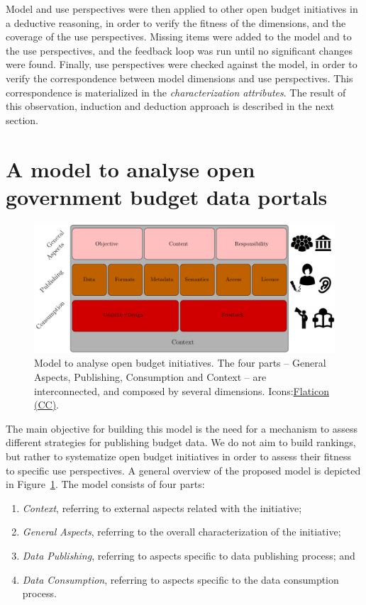 Model and use perspectives were then applied to other open budget initiatives in a deductive reasoning, in order to verify the fitness of the dimensions, and the coverage of the use perspectives.
Missing items were added to the model and to the use perspectives, and the feedback loop was run until no significant changes were found.
Finally, use perspectives were checked against the model, in order to verify the correspondence between model dimensions and use perspectives.
This correspondence is materialized in the \emph{characterization attributes}. The result of this observation, induction and deduction approach is described in the next section.

\section{A model to analyse open government budget data portals}
\label{sec:framework} 

\begin{figure}[ht]
\begin{center}
\includegraphics[scale=0.75]{images/model.pdf}
\caption{Model to analyse open budget initiatives. The four parts -- General Aspects, Publishing, Consumption and Context -- are interconnected, and composed by several dimensions. Icons:\href{http://www.flaticon.com/authors/icomoon}{Flaticon (CC)}.}
\label{fig:framework}
\end{center}
\end{figure}

The main objective for building this model is the need for a mechanism to assess different strategies for publishing budget data. 
We do not aim to build rankings, but rather to systematize open budget initiatives in order to assess their fitness to specific use perspectives. 
A general overview of the proposed model is depicted in Figure~\ref{fig:framework}. 
The model consists of four parts: 
\begin{enumerate}
\item \emph{Context}, referring to external aspects related with the initiative;
\item \emph{General Aspects}, referring to the overall characterization of the initiative;
\item \emph{Data Publishing}, referring to aspects specific to data publishing process; and
\item \emph{Data Consumption}, referring to aspects specific to the data consumption process.
\end{enumerate}

